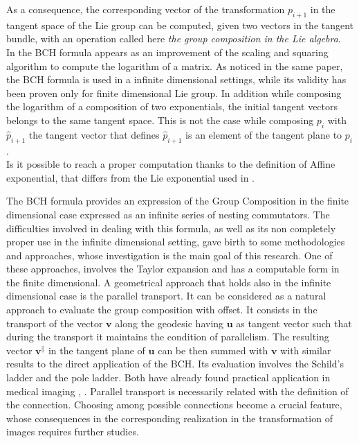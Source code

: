 As a consequence, the corresponding vector of the transformation $p_{i+1}$ in the tangent space of the Lie group can be computed, given two vectors in the tangent bundle, with an operation called here \emph{the group composition in the Lie algebra}.\\
In \cite{Bossa2007} the BCH formula appears as an improvement of the scaling and squaring algorithm to compute the logarithm of a matrix. As noticed in the same paper, the BCH formula is used in a infinite dimensional settings, while its validity has been proven only for finite dimensional Lie group. In addition while composing the logarithm of a composition of two exponentials, the initial tangent vectors belongs to the same tangent space. This is not the case while composing $p_{i}$ with $\hat{p}_{i+1}$ the tangent vector that defines $\hat{p}_{i+1}$ is an element of the tangent plane to $p_{i}$. \\
Is it possible to reach a proper computation thanks to the definition of Affine exponential, that differs from the Lie exponential used in \cite{Bossa2007} .






The BCH formula provides an expression of the Group Composition in the finite dimensional case expressed as an infinite series of nesting commutators. The difficulties involved in dealing with this formula, as well as its non completely proper use in the infinite dimensional setting, gave birth to some methodologies and approaches, whose investigation is the main goal of this research. One of these approaches, involves the Taylor expansion and has a computable form in the finite dimensional. A geometrical approach that holds also in the infinite dimensional case is the parallel transport.
It can be considered as a natural approach to evaluate the group composition with offset. It consists in the transport of the vector $\mathbf{v}$ along the geodesic having $\mathbf{u}$ as tangent vector such that during the transport it maintains the condition of parallelism. The resulting vector $\mathbf{v}^{\parallel}$ in the tangent plane of $\mathbf{u}$ can be then summed with $\mathbf{v}$ with similar results to the direct application of the BCH. Its evaluation involves the Schild's ladder and the pole ladder. Both have already found practical application in medical imaging \cite{Lorenzi:discrete_ladders:14}, \cite{Lorenzi:pt:13}.
Parallel transport is necessarily related with the definition of the connection. Choosing among possible connections become a crucial feature, whose consequences in the corresponding realization in the transformation of images requires further studies.

